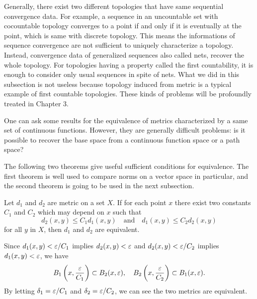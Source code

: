 \documentclass{../crs}
\begin{document}
\begin{rmk}
Generally, there exist two different topologies that have same sequential convergence data.
For example, a sequence in an uncountable set with cocountable topology converges to a point if and only if it is eventually at the point, which is same with discrete topology.
This means the informations of sequence convergence are not sufficient to uniquely characterize a topology.
Instead, convergence data of generalized sequences also called nets, recover the whole topology.
For topologies having a property called the first countability, it is enough to consider only usual sequences in spite of nets.
What we did in this subsection is not useless because topology induced from metric is a typical example of first countable topologies.
These kinds of problems will be profoundly treated in Chapter 3.
\end{rmk}
\begin{rmk}
One can ask some results for the equivalence of metrics characterized by a same set of continuous functions.
However, they are generally difficult problems: is it possible to recover the base space from a continuous function space or a path space?
\end{rmk}


The following two theorems give useful sufficient conditions for equivalence.
The first theorem is well used to compare norms on a vector space in particular, and the second theorem is going to be used in the next subsection.

\begin{thm}\label{thm:equivalent metrics}
Let $d_1$ and $d_2$ are metric on a set $X$.
If for each point $x$ there exist two constants $C_1$ and $C_2$ which may depend on $x$ such that
\[d_2(x,y)\le C_1d_1(x,y)\quad\text{and}\quad d_1(x,y)\le C_2d_2(x,y)\]
for all $y$ in $X$, then $d_1$ and $d_2$ are equivalent.
\end{thm}
\begin{pf}
Since $d_1(x,y)<\varepsilon/C_1$ implies $d_2(x,y)<\varepsilon$ and $d_2(x,y)<\varepsilon/C_2$ implies $d_1(x,y)<\varepsilon$, we have
\[B_1\left(x,\frac{\varepsilon}{C_1}\right)\subset B_2(x,\varepsilon),\quad B_2\left(x,\frac{\varepsilon}{C_2}\right)\subset B_1(x,\varepsilon).\]
By letting $\delta_1=\varepsilon/C_1$ and $\delta_2=\varepsilon/C_2$, we can see the two metrics are equivalent.
\end{pf}
\end{document}
